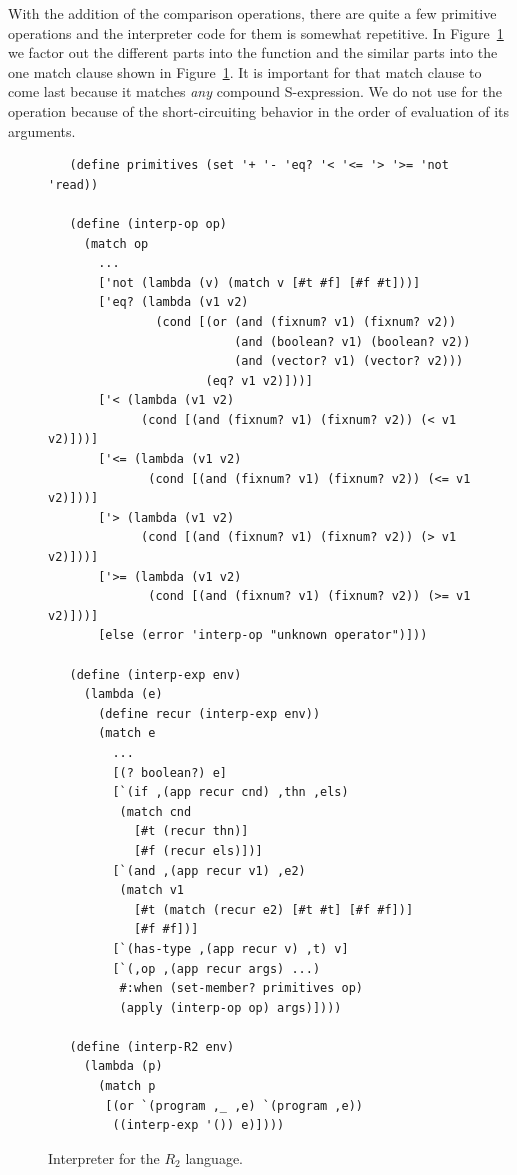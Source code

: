 \documentclass[11pt]{book}
\begin{document}
With the addition of the comparison operations, there are quite a few
primitive operations and the interpreter code for them is somewhat
repetitive. In Figure~\ref{fig:interp-R2} we factor out the different
parts into the  function and the similar parts into
the one match clause shown in Figure~\ref{fig:interp-R2}. It is
important for that match clause to come last because it matches
\emph{any} compound S-expression.  We do not use  for
the  operation because of the short-circuiting behavior in
the order of evaluation of its arguments.


\begin{figure}[tbp]
\begin{lstlisting}
   (define primitives (set '+ '- 'eq? '< '<= '> '>= 'not 'read))

   (define (interp-op op)
     (match op
       ...
       ['not (lambda (v) (match v [#t #f] [#f #t]))]
       ['eq? (lambda (v1 v2)
               (cond [(or (and (fixnum? v1) (fixnum? v2))
                          (and (boolean? v1) (boolean? v2))
                          (and (vector? v1) (vector? v2)))
                      (eq? v1 v2)]))]
       ['< (lambda (v1 v2)
             (cond [(and (fixnum? v1) (fixnum? v2)) (< v1 v2)]))]
       ['<= (lambda (v1 v2)
              (cond [(and (fixnum? v1) (fixnum? v2)) (<= v1 v2)]))]
       ['> (lambda (v1 v2)
             (cond [(and (fixnum? v1) (fixnum? v2)) (> v1 v2)]))]
       ['>= (lambda (v1 v2)
              (cond [(and (fixnum? v1) (fixnum? v2)) (>= v1 v2)]))]
       [else (error 'interp-op "unknown operator")]))

   (define (interp-exp env)
     (lambda (e)
       (define recur (interp-exp env))
       (match e
         ...
         [(? boolean?) e]
         [`(if ,(app recur cnd) ,thn ,els)
          (match cnd
            [#t (recur thn)]
            [#f (recur els)])]
         [`(and ,(app recur v1) ,e2)
          (match v1
            [#t (match (recur e2) [#t #t] [#f #f])]
            [#f #f])]
         [`(has-type ,(app recur v) ,t) v]
         [`(,op ,(app recur args) ...)
          #:when (set-member? primitives op)
          (apply (interp-op op) args)])))

   (define (interp-R2 env)
     (lambda (p)
       (match p
        [(or `(program ,_ ,e) `(program ,e))
         ((interp-exp '()) e)])))
\end{lstlisting}
\caption{Interpreter for the $R_2$ language.}
\label{fig:interp-R2}
\end{figure}
\end{document}
